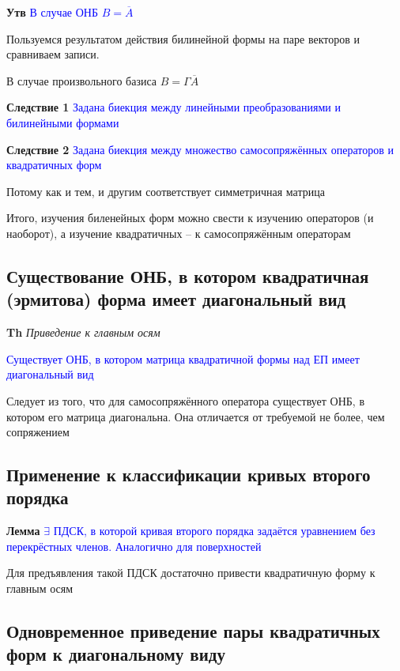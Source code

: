 \documentclass[a4paper, 14pt]{article}
\begin{document}
    \textbf{Утв} \textcolor{blue}{В случае ОНБ $B = \overline{A}$}
    
    Пользуемся результатом действия билинейной формы на паре векторов и сравниваем записи.
    
    В случае произвольного базиса $B = \Gamma \overline{A}$
    
    \textbf{Следствие 1} \textcolor{blue}{Задана биекция между линейными преобразованиями и билинейными формами}
    
    \textbf{Следствие 2} \textcolor{blue}{Задана биекция между множество самосопряжённых операторов и квадратичных форм}
    
    Потому как и тем, и другим соответствует симметричная матрица
    
    Итого, изучения биленейных форм можно свести к изучению операторов (и наоборот), а изучение квадратичных -- к
    самосопряжённым операторам
    
    \subsection{Существование ОНБ, в котором квадратичная (эрмитова) форма имеет диагональный вид}
    
    \textbf{Th} \textit{Приведение к главным осям}
    
    \textcolor{blue}{Существует ОНБ, в котором матрица квадратичной формы над ЕП имеет диагональный вид}
    
    Следует из того, что для самосопряжённого оператора существует ОНБ, в котором его матрица диагональна.
    Она отличается от требуемой не более, чем сопряжением
    
    \subsection{Применение к классификации кривых второго порядка}
    
    \textbf{Лемма} \textcolor{blue}{$\exists$ ПДСК, в которой кривая второго порядка задаётся уравнением без
    перекрёстных членов. Аналогично для поверхностей}
    
    Для предъявления такой ПДСК достаточно привести квадратичную форму к главным осям
    
    \subsection{Одновременное приведение пары квадратичных форм к диагональному виду}
    
\end{document}
